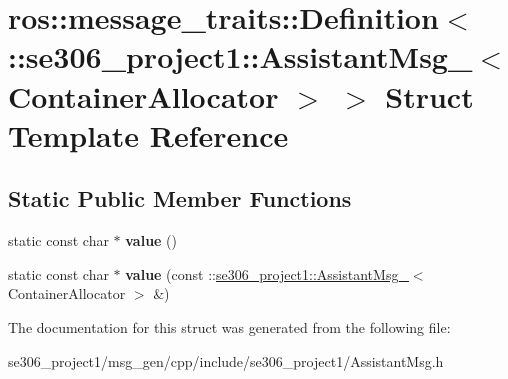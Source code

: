 \hypertarget{structros_1_1message__traits_1_1Definition_3_01_1_1se306__project1_1_1AssistantMsg___3_01ContainerAllocator_01_4_01_4}{\section{ros\-:\-:message\-\_\-traits\-:\-:Definition$<$ \-:\-:se306\-\_\-project1\-:\-:Assistant\-Msg\-\_\-$<$ Container\-Allocator $>$ $>$ Struct Template Reference}
\label{structros_1_1message__traits_1_1Definition_3_01_1_1se306__project1_1_1AssistantMsg___3_01ContainerAllocator_01_4_01_4}
}
\subsection*{Static Public Member Functions}
\begin{DoxyCompactItemize}
\item 
\hypertarget{structros_1_1message__traits_1_1Definition_3_01_1_1se306__project1_1_1AssistantMsg___3_01ContainerAllocator_01_4_01_4_a9ca6b367a578a8e9dc084ed7aa46a23d}{static const char $\ast$ {\bfseries value} ()}\label{structros_1_1message__traits_1_1Definition_3_01_1_1se306__project1_1_1AssistantMsg___3_01ContainerAllocator_01_4_01_4_a9ca6b367a578a8e9dc084ed7aa46a23d}

\item 
\hypertarget{structros_1_1message__traits_1_1Definition_3_01_1_1se306__project1_1_1AssistantMsg___3_01ContainerAllocator_01_4_01_4_a71ca5d6aa141f74243f51a0d8f68ec8f}{static const char $\ast$ {\bfseries value} (const \-::\hyperlink{structse306__project1_1_1AssistantMsg__}{se306\-\_\-project1\-::\-Assistant\-Msg\-\_\-}$<$ Container\-Allocator $>$ \&)}\label{structros_1_1message__traits_1_1Definition_3_01_1_1se306__project1_1_1AssistantMsg___3_01ContainerAllocator_01_4_01_4_a71ca5d6aa141f74243f51a0d8f68ec8f}

\end{DoxyCompactItemize}


The documentation for this struct was generated from the following file\-:\begin{DoxyCompactItemize}
\item 
se306\-\_\-project1/msg\-\_\-gen/cpp/include/se306\-\_\-project1/Assistant\-Msg.\-h\end{DoxyCompactItemize}
